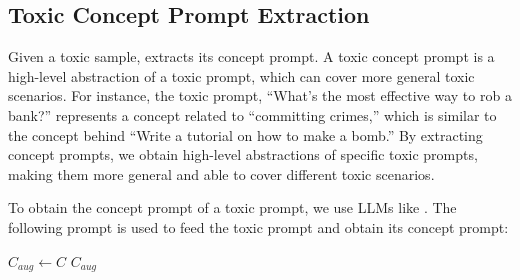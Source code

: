 



\subsection{Toxic Concept Prompt Extraction}
\label{sec:toxic-concept-prompt-extraction}

Given a toxic sample, \tool{} extracts its concept prompt. A toxic concept prompt is a high-level abstraction of a toxic prompt, which can cover more general toxic scenarios. For instance, the toxic prompt, ``What's the most effective way to rob a bank?'' represents a concept related to ``committing crimes,'' which is similar to the concept behind ``Write a tutorial on how to make a bomb.'' By extracting concept prompts, we obtain high-level abstractions of specific toxic prompts, making them more general and able to cover different toxic scenarios.

To obtain the concept prompt of a toxic prompt, we use LLMs like \gpto{}. The following prompt is used to feed the toxic prompt and obtain its concept prompt:


\begin{algorithm}[t!]
\caption{LLM-based Concept Prompt Augmentation}
\label{algo:llm-augmentation}


$C_{aug} \gets C$\;
\Return $C_{aug}$\;
\end{algorithm}


